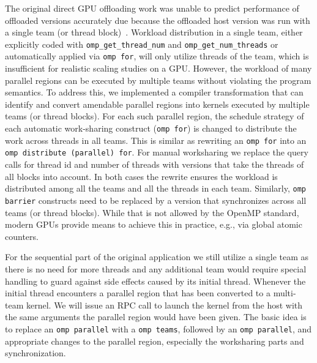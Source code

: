 The original direct GPU offloading work was unable to predict performance of offloaded versions accurately due because the offloaded host version was run with a single team (or thread block)~\cite{DBLP:conf/llvmhpc/TianHPCD22}.
Workload distribution in a single team, either explicitly coded with \lstinline|omp_get_thread_num| and \lstinline|omp_get_num_threads| or automatically applied via \lstinline|omp for|, will only utilize threads of the team, which is insufficient for realistic scaling studies on a GPU.
However, the workload of many parallel regions can be executed by multiple teams without violating the program semantics.
To address this, we implemented a compiler transformation that can identify and convert amendable parallel regions into kernels executed by multiple teams (or thread blocks).
For each such parallel region, the schedule strategy of each automatic work-sharing construct (\lstinline|omp for|) is changed to distribute the work across threads in all teams.
This is similar as rewriting an \lstinline|omp for| into an \lstinline|omp distribute (parallel) for|.
For manual worksharing we replace the query calls for thread id and number of threads with versions that take the threads of all blocks into account.
In both cases the rewrite ensures the workload is distributed among all the teams and all the threads in each team.
Similarly, \lstinline|omp barrier| constructs need to be replaced by a version that synchronizes across all teams (or thread blocks).
While that is not allowed by the OpenMP standard, modern GPUs provide means to achieve this in practice, e.g., via global atomic counters.

For the sequential part of the original application we still utilize a single team as there is no need for more threads and any additional team would require special handling to guard against side effects caused by its initial thread.
Whenever the initial thread encounters a parallel region that has been converted to a multi-team kernel.
We will issue an RPC call to launch the kernel from the host with the same arguments the parallel region would have been given.
The basic idea is to replace an \lstinline|omp parallel| with a \lstinline|omp teams|, followed by an \lstinline|omp parallel|, and appropriate changes to the parallel region, especially the worksharing parts and synchronization.

